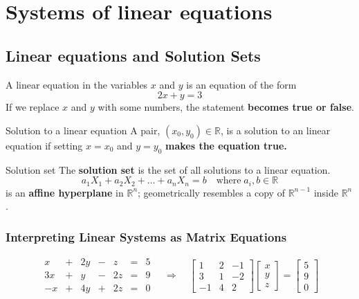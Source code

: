 \documentclass[a4paper, 9pt]{extarticle}
\begin{document}
\pagebreak

\section{Systems of linear equations}
\subsection{Linear equations and Solution Sets}
A linear equation in the variables $x$ and
$y$ is an equation of the form
\begin{equation*}
  2x + y = 3
\end{equation*}
If we replace $x$ and $y$ with some numbers, the statement \textbf{becomes true or false}.

\begin{definitionbox}{Solution to a linear equation}{}
  A pair, $(x_0, y_0) \in \mathbb{R}$, is a solution to an linear equation if setting $x = x_0$ and $y = y_0$ \textbf{makes the equation true.}
\end{definitionbox}

\begin{definitionbox}{Solution set}{}
  The \textbf{solution set} is the set of all solutions to a linear equation.
  $$a_1X_1 + a_2X_2 + \ldots + a_nX_n = b \quad \text{where} \; a_i, b \in \mathbb{R}$$
  is an \textbf{affine hyperplane} in $\mathbb{R}^n$; geometrically resembles a copy of $\mathbb{R}^{n-1}$ inside $\mathbb{R}^n$.
\end{definitionbox}
\subsubsection{Interpreting Linear Systems as Matrix Equations}
$$
  \begin{array}{ccccccc}
    x  & + & 2y & - & z  & = & 5 \\
    3x & + & y  & - & 2z & = & 9 \\
    -x & + & 4y & + & 2z & = & 0
  \end{array}
  \quad \Rightarrow \quad
  \begin{bmatrix}
    1  & 2 & -1 \\
    3  & 1 & -2 \\
    -1 & 4 & 2
  \end{bmatrix}
  \begin{bmatrix}
    x \\
    y \\
    z
  \end{bmatrix}
  =
  \begin{bmatrix}
    5 \\
    9 \\
    0
  \end{bmatrix}
$$
\end{document}
